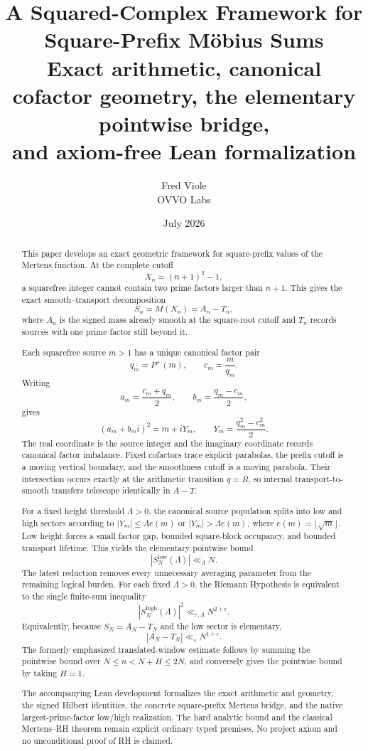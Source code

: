 \documentclass[11pt]{article}
\title{\textbf{A Squared-Complex Framework for Square-Prefix M\"obius Sums}\\[0.5em]
\large Exact arithmetic, canonical cofactor geometry, the elementary pointwise bridge,\\
and axiom-free Lean formalization}
\author{Fred Viole\\OVVO Labs}
\date{July 2026}
\theoremstyle{definition}
\theoremstyle{remark}
\newcommand{\eps}{\varepsilon}
\newcommand{\Pplus}{P^{+}}
\newcommand{\1}{\mathbf{1}}
\begin{document}
\pagestyle{fancy}
\fancyhf{}
\fancyfoot[C]{\thepage}
\maketitle

\begin{abstract}
This paper develops an exact geometric framework for square-prefix values of the Mertens function.  At the complete cutoff
\[
 X_n=(n+1)^2-1,
\]
a squarefree integer cannot contain two prime factors larger than $n+1$.  This gives the exact smooth--transport decomposition
\[
 S_n=M(X_n)=A_n-T_n,
\]
where $A_n$ is the signed mass already smooth at the square-root cutoff and $T_n$ records sources with one prime factor still beyond it.

Each squarefree source $m>1$ has a unique canonical factor pair
\[
 q_m=\Pplus(m),\qquad c_m=\frac{m}{q_m}.
\]
Writing
\[
 a_m=\frac{c_m+q_m}{2},\qquad b_m=\frac{q_m-c_m}{2},
\]
gives
\[
 (a_m+b_m i)^2=m+iY_m,
 \qquad
 Y_m=\frac{q_m^2-c_m^2}{2}.
\]
The real coordinate is the source integer and the imaginary coordinate records canonical factor imbalance.  Fixed cofactors trace explicit parabolas, the prefix cutoff is a moving vertical boundary, and the smoothness cutoff is a moving parabola.  Their intersection occurs exactly at the arithmetic transition $q=R$, so internal transport-to-smooth transfers telescope identically in $A-T$.

For a fixed height threshold $\Lambda>0$, the canonical source population splits into low and high sectors according to $|Y_m|\le\Lambda e(m)$ or $|Y_m|>\Lambda e(m)$, where $e(m)=\lfloor\sqrt m\rfloor$.  Low height forces a small factor gap, bounded square-block occupancy, and bounded transport lifetime.  This yields the elementary pointwise bound
\[
 |S_N^{\mathrm{low}}(\Lambda)|\ll_\Lambda N.
\]
The latest reduction removes every unnecessary averaging parameter from the remaining logical burden.  For each fixed $\Lambda>0$, the Riemann Hypothesis is equivalent to the single finite-sum inequality
\[
 \boxed{
 \left|S_N^{\mathrm{high}}(\Lambda)\right|^2
 \ll_{\eps,\Lambda}N^{2+\eps}.
 }
\]
Equivalently, because $S_N=A_N-T_N$ and the low sector is elementary,
\[
 \boxed{|A_N-T_N|\ll_\eps N^{1+\eps}.}
\]
The formerly emphasized translated-window estimate follows by summing the pointwise bound over $N\le n<N+H\le2N$, and conversely gives the pointwise bound by taking $H=1$.

The accompanying Lean development formalizes the exact arithmetic and geometry, the signed Hilbert identities, the concrete square-prefix Mertens bridge, and the native largest-prime-factor low/high realization.  The hard analytic bound and the classical Mertens--RH theorem remain explicit ordinary typed premises.  No project axiom and no unconditional proof of RH is claimed.
\end{abstract}
\end{document}
